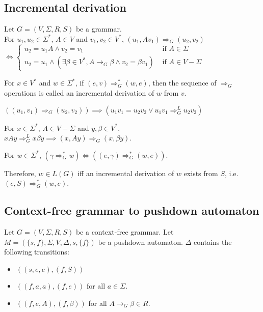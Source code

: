 \subsection{Incremental derivation}

\begin{definition}
Let $G = (V, \Sigma, R, S)$ be a grammar.\\
For $u_1, u_2 \in \Sigma^*$, $A \in V$ and $v_1, v_2 \in V^*$,
$(u_1, Av_1) \Rightarrow_G (u_2, v_2)$\\
$\iff \begin{cases}
u_2 = u_1A \wedge v_2 = v_1 & \textrm{ if } A \in \Sigma\\
u_2 = u_1 \wedge
(\exists \beta \in V^*, A \rightarrow_G \beta \wedge v_2 = \beta v_1)
& \textrm{ if } A \in V - \Sigma \end{cases}$
\end{definition}

For $x \in V^*$ and $w \in \Sigma^*$, if $(e, v) \Rightarrow_G^* (w, e)$,
then the sequence of $\Rightarrow_G$ operations
is called an incremental derivation of $w$ from $v$.

\begin{lemma}
$((u_1, v_1) \Rightarrow_G (u_2, v_2)) \implies (u_1v_1 = u_2v_2 \vee u_1v_1 \Rightarrow_G^L u_2v_2)$
\end{lemma}
\begin{lemma}
For $x \in \Sigma^*$, $A \in V-\Sigma$ and $y, \beta \in V^*$,\\
$xAy \Rightarrow_G^L x\beta y \implies (x, Ay) \Rightarrow_G (x, \beta y)$.
\end{lemma}
\begin{theorem}
For $w \in \Sigma^*$,
$(\gamma \Rightarrow_G^* w) \iff ((e, \gamma) \Rightarrow_G^* (w, e))$.
\end{theorem}
Therefore, $w \in L(G)$ iff an incremental derivation of $w$ exists from $S$,
i.e. $(e, S) \Rightarrow_G^* (w, e)$.

\subsection{Context-free grammar to pushdown automaton}

Let $G = (V, \Sigma, R, S)$ be a context-free grammar.
Let $M = (\{s, f\}, \Sigma, V, \Delta, s, \{f\})$ be a pushdown automaton.
$\Delta$ contains the following transitions:
\begin{itemize}
\item $((s, e, e), (f, S))$
\item $((f, a, a), (f, e))$ for all $a \in \Sigma$.
\item $((f, e, A), (f, \beta))$ for all $A \rightarrow_G \beta \in R$.
\end{itemize}

